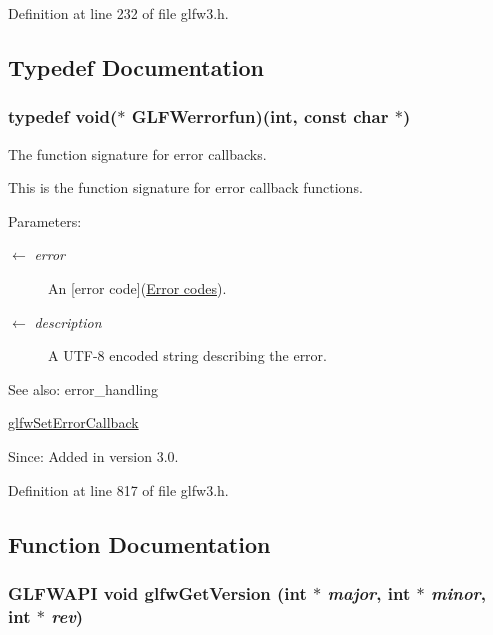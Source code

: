 Definition at line 232 of file glfw3.h.

\subsection{Typedef Documentation}
\hypertarget{group__init_g6f2c8574259246a83b1d0c3baf23046f}{
\subsubsection[GLFWerrorfun]{\setlength{\rightskip}{0pt plus 5cm}typedef void($\ast$  {\bf GLFWerrorfun})(int, const char $\ast$)}}
\label{group__init_g6f2c8574259246a83b1d0c3baf23046f}


The function signature for error callbacks. 

This is the function signature for error callback functions.

\begin{Desc}
\item[Parameters:]
\begin{description}
\item[\mbox{$\leftarrow$} {\em error}]An \mbox{[}error code\mbox{]}(\hyperlink{group__errors}{Error codes}). \item[\mbox{$\leftarrow$} {\em description}]A UTF-8 encoded string describing the error.\end{description}
\end{Desc}
\begin{Desc}
\item[See also:]error\_\-handling 

\hyperlink{group__init_g5919096b958c47102126061fb5a6f9c3}{glfwSetErrorCallback}\end{Desc}
\begin{Desc}
\item[Since:]Added in version 3.0. \end{Desc}


Definition at line 817 of file glfw3.h.

\subsection{Function Documentation}
\hypertarget{group__init_g2402c7824ac0194c13722790ff9559ff}{
\subsubsection[glfwGetVersion]{\setlength{\rightskip}{0pt plus 5cm}GLFWAPI void glfwGetVersion (int $\ast$ {\em major}, \/  int $\ast$ {\em minor}, \/  int $\ast$ {\em rev})}}
\label{group__init_g2402c7824ac0194c13722790ff9559ff}


